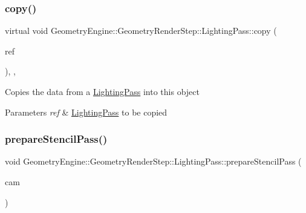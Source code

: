 \mbox{\label{class_geometry_engine_1_1_geometry_render_step_1_1_lighting_pass_a4865616b03a872033a6f9abc5c370374}} 
\subsubsection{\texorpdfstring{copy()}{copy()}}
{\footnotesize\ttfamily virtual void Geometry\+Engine\+::\+Geometry\+Render\+Step\+::\+Lighting\+Pass\+::copy (\begin{DoxyParamCaption}\item[{const \mbox{\hyperlink{class_geometry_engine_1_1_geometry_render_step_1_1_lighting_pass}{Lighting\+Pass}} \&}]{ref }\end{DoxyParamCaption})\hspace{0.3cm}{\ttfamily [inline]}, {\ttfamily [protected]}, {\ttfamily [virtual]}}

Copies the data from a \mbox{\hyperlink{class_geometry_engine_1_1_geometry_render_step_1_1_lighting_pass}{Lighting\+Pass}} into this object 
\begin{DoxyParams}{Parameters}
{\em ref} & \mbox{\hyperlink{class_geometry_engine_1_1_geometry_render_step_1_1_lighting_pass}{Lighting\+Pass}} to be copied \\
\hline
\end{DoxyParams}
\mbox{\label{class_geometry_engine_1_1_geometry_render_step_1_1_lighting_pass_a1a3280c28b0750c7cad03f01d37374c7}} 
\subsubsection{\texorpdfstring{prepareStencilPass()}{prepareStencilPass()}}
{\footnotesize\ttfamily void Geometry\+Engine\+::\+Geometry\+Render\+Step\+::\+Lighting\+Pass\+::prepare\+Stencil\+Pass (\begin{DoxyParamCaption}\item[{\mbox{\hyperlink{class_geometry_engine_1_1_geometry_world_item_1_1_geometry_camera_1_1_camera}{Geometry\+World\+Item\+::\+Geometry\+Camera\+::\+Camera}} $\ast$}]{cam }\end{DoxyParamCaption})\hspace{0.3cm}{\ttfamily [protected]}}

